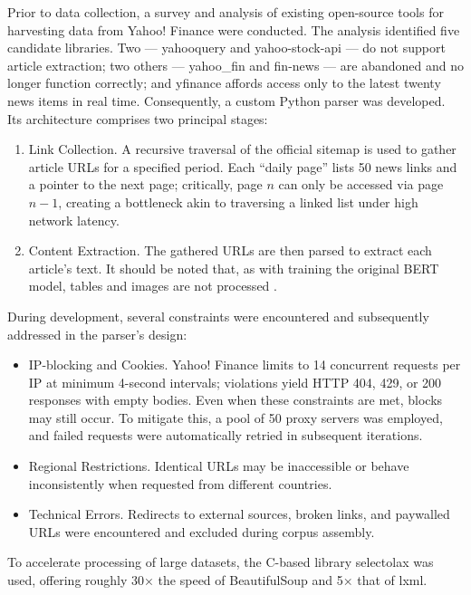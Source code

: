 Prior to data collection, a survey and analysis of existing open-source tools for harvesting data from Yahoo! Finance were conducted.
The analysis identified five candidate libraries. Two --- yahooquery and yahoo-stock-api --- do not support article extraction;
two others --- yahoo\_fin and fin-news --- are abandoned and no longer function correctly; and yfinance affords access only
to the latest twenty news items in real time. Consequently, a custom Python parser was developed. Its architecture comprises
two principal stages:

\begin{enumerate}
    \item Link Collection. A recursive traversal of the official sitemap is used to gather article URLs for a specified
    period. Each “daily page” lists 50 news links and a pointer to the next page; critically, page $n$ can only be accessed
    via page $n - 1$, creating a bottleneck akin to traversing a linked list under high network latency.
    \item Content Extraction. The gathered URLs are then parsed to extract each article's text. It should be noted that,
    as with training the original BERT model, tables and images are not processed \parencite{devlin2019BERT}.
\end{enumerate}

During development, several constraints were encountered and subsequently addressed in the parser's design:

\begin{itemize}
    \item IP-blocking and Cookies. Yahoo! Finance limits to 14 concurrent requests per IP at minimum 4-second intervals;
    violations yield HTTP 404, 429, or 200 responses with empty bodies. Even when these constraints are met, blocks may
    still occur. To mitigate this, a pool of 50 proxy servers was employed, and failed requests were automatically retried
    in subsequent iterations.
    \item Regional Restrictions. Identical URLs may be inaccessible or behave inconsistently when requested from different
    countries.
    \item Technical Errors. Redirects to external sources, broken links, and paywalled URLs were encountered and excluded
    during corpus assembly.
\end{itemize}

To accelerate processing of large datasets, the C-based library selectolax was used, offering roughly 30× the speed
of BeautifulSoup and 5× that of lxml.

